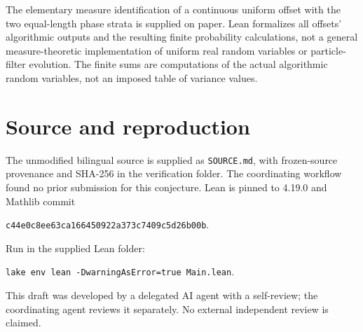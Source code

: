 \documentclass[11pt]{article}
\begin{document}
The elementary measure identification of a continuous uniform offset
with the two equal-length phase strata is supplied on paper. Lean
formalizes all offsets' algorithmic outputs and the resulting finite
probability calculations, not a general measure-theoretic implementation
of uniform real random variables or particle-filter evolution. The
finite sums are computations of the actual algorithmic random variables,
not an imposed table of variance values.

\section*{Source and reproduction}
The unmodified bilingual source is supplied as \texttt{SOURCE.md},
with frozen-source provenance and SHA-256 in the verification folder.
The coordinating workflow found no prior submission for this conjecture.
Lean is pinned to 4.19.0 and Mathlib commit
\begin{center}\texttt{c44e0c8ee63ca166450922a373c7409c5d26b00b}.\end{center}
Run in the supplied Lean folder:
\begin{center}\texttt{lake env lean -DwarningAsError=true Main.lean}.\end{center}
This draft was developed by a delegated AI agent with a self-review;
the coordinating agent reviews it separately. No external independent
review is claimed.
\end{document}
